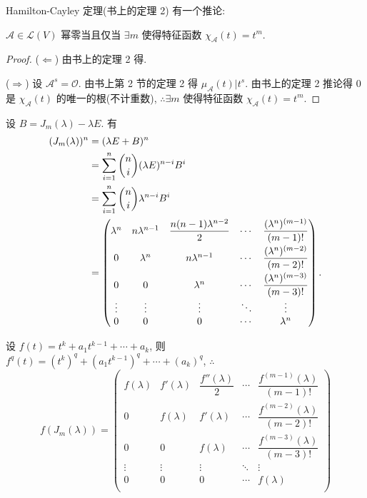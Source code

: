\documentclass[color=black,device=normal,lang=cn,mode=geye]{elegantnote}
\begin{document}
Hamilton-Cayley 定理(书上的定理 2) 有一个推论:
\begin{corollary}\label{c4.1}
    $\mathcal{A}\in\mathcal{L}(V)$ 幂零当且仅当 $\exists m$ 使得特征函数 $\chi_{\mathcal{A}}(t)=t^m$.
\end{corollary}
\begin{proof}
    ($\Leftarrow$) 由书上的定理 2 得.

    ($\Rightarrow$) 设 $\mathcal{A}^s=\mathcal{O}$. 由书上第 2 节的定理 2 得 $\mu_\mathcal{A}(t)|t^s$. 由书上的定理 2 推论得 $0$ 是 $\chi_{\mathcal{A}}(t)$ 的唯一的根(不计重数), $\therefore\exists m$ 使得特征函数 $\chi_{\mathcal{A}}(t)=t^m$.
\end{proof}
\begin{example}[书上的例 3]
    设 $B=J_m(\lambda)-\lambda E$. 有
    \begin{equation}\label{eq4.1}
        \begin{aligned}
            (J_m(\lambda))^n & =(\lambda E+B)^n \\
            & =\sum\limits_{i=1}^n\dbinom{n}{i}(\lambda E)^{n-i}B^i \\
            & =\sum\limits_{i=1}^n\dbinom{n}{i}\lambda^{n-i}B^i \\
            & =\begin{pmatrix}
                \lambda^n & n\lambda^{n-1} & \dfrac{n(n-1)\lambda^{n-2}}{2} & \cdots & \dfrac{(\lambda^n)^{(m-1)}}{(m-1)!} \\[8pt]
                0 & \lambda^n & n\lambda^{n-1} & \cdots & \dfrac{(\lambda^n)^{(m-2)}}{(m-2)!} \\[8pt]
                0 & 0 & \lambda^n & \cdots & \dfrac{(\lambda^n)^{(m-3)}}{(m-3)!} \\
                \vdots & \vdots & \vdots & \ddots & \vdots \\
                0 & 0 & 0 & \cdots & \lambda^n \\
            \end{pmatrix}.
        \end{aligned}
    \end{equation}

    设 $f(t)=t^k+a_1t^{k-1}+\cdots+a_k$, 则 $f^{q}(t)=(t^k)^{q}+(a_1t^{k-1})^{q}+\cdots+(a_k)^{q}$, $\therefore$
    \[f(J_m(\lambda))=\begin{pmatrix}
        f(\lambda) & f'(\lambda) & \dfrac{f''(\lambda)}{2} & \cdots & \dfrac{f^{(m-1)}(\lambda)}{(m-1)!} \\[8pt]
        0 & f(\lambda) & f'(\lambda) & \cdots & \dfrac{f^{(m-2)}(\lambda)}{(m-2)!} \\[8pt]
        0 & 0 & f(\lambda) & \cdots & \dfrac{f^{(m-3)}(\lambda)}{(m-3)!} \\
        \vdots & \vdots & \vdots & \ddots & \vdots \\
        0 & 0 & 0 & \cdots & f(\lambda) \\
    \end{pmatrix}\]
\end{example}
\end{document}
